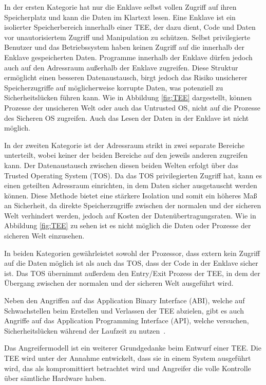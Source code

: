 In der ersten Kategorie hat nur die Enklave selbst vollen Zugriff auf ihren Speicherplatz und kann die Daten im Klartext lesen. 
Eine Enklave ist ein isolierter Speicherbereich innerhalb einer TEE, der dazu dient, Code und Daten vor unautorisiertem Zugriff und Manipulation zu schützen.
Selbst privilegierte Benutzer und das Betriebssystem haben keinen Zugriff auf die innerhalb der Enklave gespeicherten Daten. 
Programme innerhalb der Enklave dürfen jedoch auch auf den Adressraum außerhalb der Enklave zugreifen. 
Diese Struktur ermöglicht einen besseren Datenaustausch, birgt jedoch das Risiko unsicherer Speicherzugriffe auf möglicherweise korrupte Daten, was potenziell zu Sicherheitslücken führen kann. Wie in Abbildung \ref{fig:TEE} dargestellt, können Prozesse der unsicheren Welt oder auch das Untrusted OS, nicht auf die Prozesse des Sicheren OS zugreifen. Auch das Lesen der Daten in der Enklave ist nicht möglich.

In der zweiten Kategorie ist der Adressraum strikt in zwei separate Bereiche unterteilt, wobei keiner der beiden Bereiche auf den jeweils anderen zugreifen kann. 
Der Datenaustausch zwischen diesen beiden Welten erfolgt über das Trusted Operating System (TOS). 
Da das TOS privilegierten Zugriff hat, kann es einen geteilten Adressraum einrichten, in dem Daten sicher ausgetauscht werden können. 
Diese Methode bietet eine stärkere Isolation und somit ein höheres Maß an Sicherheit, da direkte Speicherzugriffe zwischen der normalen und der sicheren Welt verhindert werden, jedoch auf Kosten der Datenübertragungsraten. Wie in Abbildung \ref{fig:TEE} zu sehen ist es nicht möglich die Daten oder Prozesse der sicheren Welt einzusehen.

In beiden Kategorien gewährleistet sowohl der Prozessor, dass extern kein Zugriff auf die Daten möglich ist als auch das TOS, dass der Code in der Enklave sicher ist. Das TOS übernimmt außerdem den Entry/Exit Prozess der TEE, in dem der Übergang zwischen der normalen und der sicheren Welt ausgeführt wird. 

Neben den Angriffen auf das Application Binary Interface (ABI), welche auf Schwachstellen beim Erstellen und Verlassen der TEE abzielen, gibt es auch Angriffe auf das Application Programming Interface (API), welche versuchen, Sicherheitslücken während der Laufzeit zu nutzen~\cite{TEEPaper}.

Das Angreifermodell ist ein weiterer Grundgedanke beim Entwurf einer TEE. Die TEE wird unter der Annahme entwickelt, dass sie in einem System ausgeführt wird, das als kompromittiert betrachtet wird und Angreifer die volle Kontrolle über sämtliche Hardware haben.


